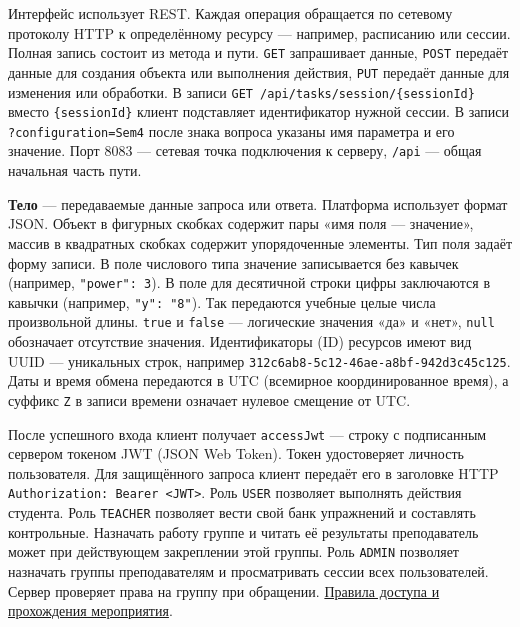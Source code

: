 \documentclass[12pt,a4paper]{article}
\begin{document}
\hypertarget{как-читать-запись-операции}{}

Интерфейс использует REST. Каждая операция обращается по сетевому протоколу HTTP к определённому ресурсу --- например, расписанию или сессии. Полная запись состоит из метода и пути. \texttt{GET} запрашивает данные, \texttt{POST} передаёт данные для создания объекта или выполнения действия, \texttt{PUT} передаёт данные для изменения или обработки. В записи \texttt{GET /\allowbreak{}api/\allowbreak{}tasks/\allowbreak{}session/\allowbreak{}\{session\allowbreak{}Id\}} вместо \texttt{\{session\allowbreak{}Id\}} клиент подставляет идентификатор нужной сессии. В записи \texttt{?configuration=Sem4} после знака вопроса указаны имя параметра и его значение. Порт 8083 --- сетевая точка подключения к серверу, \texttt{/api} --- общая начальная часть пути.

\textbf{Тело} --- передаваемые данные запроса или ответа. Платформа использует формат JSON. Объект в фигурных скобках содержит пары «имя поля --- значение», массив в квадратных скобках содержит упорядоченные элементы. Тип поля задаёт форму записи. В поле числового типа значение записывается без кавычек (например, \texttt{"power":\ 3}). В поле для десятичной строки цифры заключаются в кавычки (например, \texttt{"y":\ "8"}). Так передаются учебные целые числа произвольной длины. \texttt{true} и \texttt{false} --- логические значения «да» и «нет», \texttt{null} обозначает отсутствие значения. Идентификаторы (ID) ресурсов имеют вид UUID --- уникальных строк, например \texttt{312c6ab8-\allowbreak{}5c12-\allowbreak{}46ae-\allowbreak{}a8bf-\allowbreak{}942d3c45c125}. Даты и время обмена передаются в UTC (всемирное координированное время), а суффикс \texttt{Z} в записи времени означает нулевое смещение от UTC.

После успешного входа клиент получает \texttt{accessJwt} --- строку с подписанным сервером токеном JWT (JSON Web Token). Токен удостоверяет личность пользователя. Для защищённого запроса клиент передаёт его в заголовке HTTP \texttt{Authorization:\ Bearer\ \textless{}JWT\textgreater{}}. Роль \texttt{USER} позволяет выполнять действия студента. Роль \texttt{TEACHER} позволяет вести свой банк упражнений и составлять контрольные. Назначать работу группе и читать её результаты преподаватель может при действующем закреплении этой группы. Роль \texttt{ADMIN} позволяет назначать группы преподавателям и просматривать сессии всех пользователей. Сервер проверяет права на группу при обращении. {\href{../02\_Техническое\_задание/DOC-02\_Техническое\_задание.pdf\#правила-доступа-и-прохождения-контрольного-мероприятия}{Правила доступа и прохождения мероприятия}}.
\end{document}
